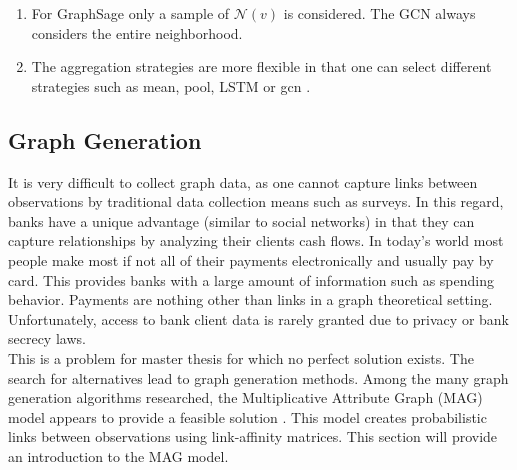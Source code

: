 	\begin{enumerate}
		\item For GraphSage only a sample of $\mathcal{N}(v)$ is considered. 
			The GCN always considers the entire neighborhood.
		\item The aggregation strategies are more flexible in that one can
			select different strategies such as mean, pool, LSTM or gcn
			\citep[p. ]{hamilton2017inductive}. 
	\end{enumerate}

	\subsection{Graph Generation}

	It is very difficult to collect graph data, as one cannot capture links
	between observations by traditional data collection means such as surveys. 
	In this regard, banks have a unique advantage (similar to social networks)
	in that they can capture relationships by analyzing their clients cash
	flows. In today's world most people make most if not all of their payments
	electronically and usually pay by card. This provides banks with a large
	amount of information such as spending behavior. Payments are nothing other
	than links in a graph theoretical setting. Unfortunately, access to bank
	client data is rarely granted due to privacy or bank secrecy laws. \\

	\noindent This is a problem for master thesis for which no perfect solution 
	exists. The	search for alternatives lead to graph generation methods. 
	Among the many graph generation algorithms researched, the 
	Multiplicative Attribute Graph (MAG) model appears to provide a feasible 
	solution \citep{kim2012multiplicative}. This model creates probabilistic 
	links between observations using link-affinity matrices. This section will
	provide an introduction to the MAG model. \\
